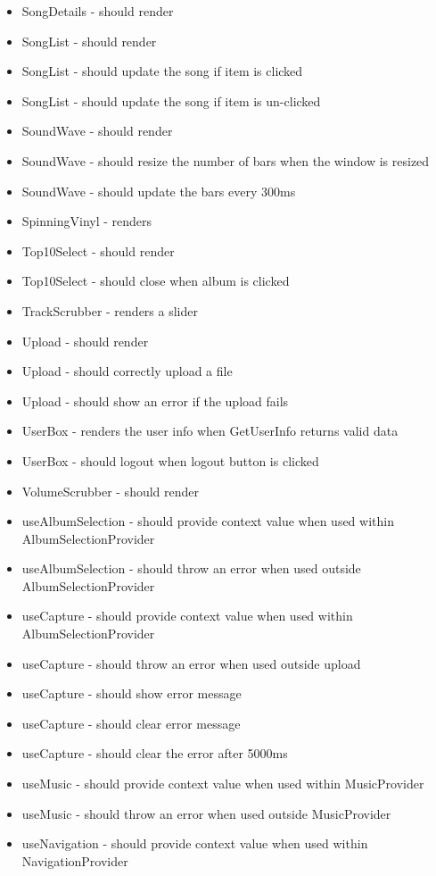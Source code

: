 \begin{multicols}{1}
\begin{itemize}
\item SongDetails - should render
\item SongList - should render
\item SongList - should update the song if item is clicked
\item SongList - should update the song if item is un-clicked
\item SoundWave - should render
\item SoundWave - should resize the number of bars when the window is resized
\item SoundWave - should update the bars every 300ms
\item SpinningVinyl - renders
\item Top10Select - should render
\item Top10Select - should close when album is clicked
\item TrackScrubber - renders a slider
\item Upload - should render
\item Upload - should correctly upload a file
\item Upload - should show an error if the upload fails
\item UserBox - renders the user info when GetUserInfo returns valid data
\item UserBox - should logout when logout button is clicked
\item VolumeScrubber - should render
\item useAlbumSelection - should provide context value when used within AlbumSelectionProvider
\item useAlbumSelection - should throw an error when used outside AlbumSelectionProvider
\item useCapture - should provide context value when used within AlbumSelectionProvider
\item useCapture - should throw an error when used outside upload
\item useCapture - should show error message
\item useCapture - should clear error message
\item useCapture - should clear the error after 5000ms
\item useMusic - should provide context value when used within MusicProvider
\item useMusic - should throw an error when used outside MusicProvider
\item useNavigation - should provide context value when used within NavigationProvider

\end{itemize}
\end{multicols}
